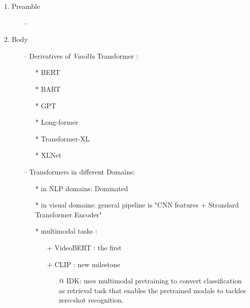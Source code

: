 \documentclass{report}
\begin{document}
	
	\begin{enumerate}
		\item Preamble
		\begin{itemize}
			\item[--] 
		\end{itemize}
		
		\item Body
		\begin{itemize}
			\item[--] Derivatives of \textit{Vanilla} Transformer :
			\begin{itemize}
				\item[*] BERT \cite{bert}
				\item[*] BART \cite{BART}
				\item[*] GPT \cite{gpt}
				\item[*] Long-former \cite{Longformer}
				\item[*] Transformer-XL \cite{Transformer-XL}
				\item[*] XLNet \cite{XLNet}
			\end{itemize}
			\item[--] Transformers in different Domains:
			\begin{itemize}
				\item[*] in NLP domains: Dominated
				\item[*] in visual domains: general pipeline is "CNN features + Strandard Transformer Encoder" 
				\item[*] multimodal tasks :
				\begin{itemize}
					\item[+] VideoBERT : the first
					\item[+] CLIP : new milestone 
					\begin{itemize}
						\item[@] IDK: uses multimodal pretraining to convert classification as retrieval task that enables the pretrained modals to tackles zero-shot recognition.
					\end{itemize}
					

\end{itemize}
\end{itemize}
\end{itemize}
\end{enumerate}
\end{document}
